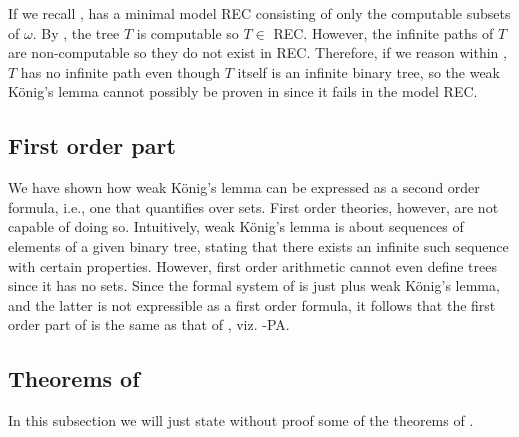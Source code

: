 \documentclass[../main.tex]{memoir}
\begin{document}
If we recall , \rca has a minimal model REC consisting of only the computable subsets of $\omega$. By , the tree $T$ is computable so $T \in$ REC. However, the infinite paths of $T$ are non-computable so they do not exist in REC. Therefore, if we reason within \rca, $T$ has no infinite path even though $T$ itself is an infinite binary tree, so the weak König's lemma cannot possibly be proven in \rca since it fails in the model REC.

\subsection{First order part}

We have shown how weak König's lemma can be expressed as a second order formula, i.e., one that quantifies over sets. First order theories, however, are not capable of doing so. Intuitively, weak König's lemma is about sequences of elements of a given binary tree, stating that there exists an infinite such sequence with certain properties. However, first order arithmetic cannot even define trees since it has no sets. Since the formal system of \wkl is just \rca plus weak König's lemma, and the latter is not expressible as a first order formula, it follows that the first order part of \wkl is the same as that of \rca, viz. \re-PA.

\subsection{Theorems of \wkl}

In this subsection we will just state without proof some of the theorems of \wkl.
\end{document}
